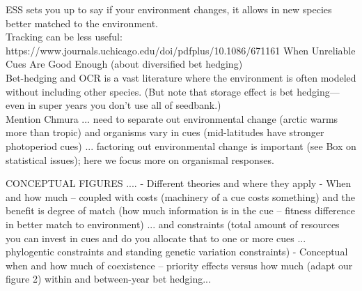 \documentclass[11pt,letterpaper]{article}
\begin{document}
ESS sets you up to say if your environment changes, it allows in new species better matched to the environment. \\
Tracking can be less useful: https://www.journals.uchicago.edu/doi/pdfplus/10.1086/671161 When Unreliable Cues Are Good Enough (about diversified bet hedging)\\
Bet-hedging and OCR is a vast literature where the environment is often modeled without including other species. (But note that storage effect is bet hedging---even in super years you don't use all of seedbank.)\\
Mention Chmura ... need to separate out environmental change (arctic warms more than tropic) and organisms vary in cues (mid-latitudes have stronger photoperiod cues) ... factoring out environmental change is important (see Box on statistical issues); here we focus more on organismal responses. 


CONCEPTUAL FIGURES ....
- Different theories and where they apply
- When and how much -- coupled with costs (machinery of a cue costs something) and the benefit is degree of match (how much information is in the cue -- fitness difference in better match to environment) ... and constraints (total amount of resources you can invest in cues and do you allocate that to one or more cues ... phylogentic constraints and standing genetic variation constraints) 
- Conceptual when and how much of coexistence -- priority effects versus how much (adapt our figure 2) within and between-year bet hedging...


\newpage


\end{document}
